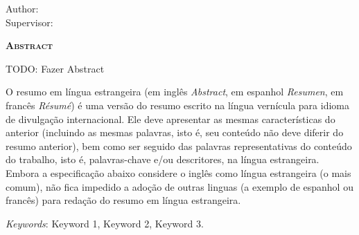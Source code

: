 \begin{center}
	{\Large{\textbf{\thesistitle}}}
\end{center}

\vspace{1cm}

\begin{flushright}
	Author: \thesisauthor\\
	Supervisor: \thesissupervisor
\end{flushright}

\vspace{1cm}

\begin{center}
	\Large{\textsc{\textbf{Abstract}}}
\end{center}

TODO: Fazer Abstract

\noindent O resumo em língua estrangeira (em inglês \textit{Abstract}, em
espanhol \textit{Resumen}, em francês \textit{Résumé}) é uma versão do resumo
escrito na língua vernícula para idioma de divulgação internacional. Ele deve
apresentar as mesmas características do anterior (incluindo as mesmas palavras,
isto é, seu conteúdo não deve diferir do resumo anterior), bem como ser seguido
das palavras representativas do conteúdo do trabalho, isto é, palavras-chave
e/ou descritores, na língua estrangeira. Embora a especificação abaixo considere
o inglês como língua estrangeira (o mais comum), não fica impedido a adoção de
outras linguas (a exemplo de espanhol ou francês) para redação do resumo em
língua estrangeira.

\noindent\textit{Keywords}: Keyword 1, Keyword 2, Keyword 3.